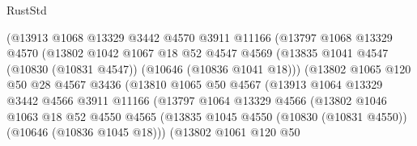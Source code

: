 \begin{lexlean}{RustStd}
\begin{coremodule}
                          (@13913
                            @1068
                            @13329
                            @3442
                            @4570
                            @3911
                            @11166
                            (@13797
                              @1068
                              @13329
                              @4570
                              (@13802
                                @1042
                                @1067
                                @18
                                @52
                                @4547
                                @4569
                                (@13835
                                  @1041
                                  @4547
                                  (@10830 (@10831 @4547))
                                  (@10646 (@10836 @1041 @18)))
                                (@13802
                                  @1065
                                  @120
                                  @50
                                  @28
                                  @4567
                                  @3436
                                  (@13810
                                    @1065
                                    @50
                                    @4567
                                    (@13913
                                      @1064
                                      @13329
                                      @3442
                                      @4566
                                      @3911
                                      @11166
                                      (@13797
                                        @1064
                                        @13329
                                        @4566
                                        (@13802
                                          @1046
                                          @1063
                                          @18
                                          @52
                                          @4550
                                          @4565
                                          (@13835
                                            @1045
                                            @4550
                                            (@10830 (@10831 @4550))
                                            (@10646 (@10836 @1045 @18)))
                                          (@13802
                                            @1061
                                            @120
                                            @50

\end{coremodule}
\end{lexlean}
